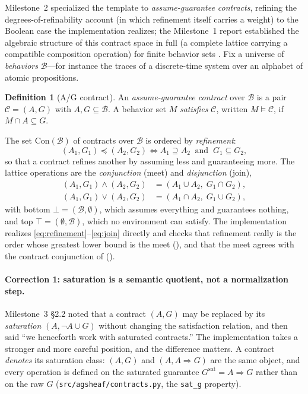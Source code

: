 \documentclass[11pt]{article}
\renewcommand{\preceq}{\preccurlyeq}
\newcommand{\contract}[1]{\mathrm{Con}(#1)}
\newcommand{\meet}{\wedge}
\newcommand{\join}{\vee}
\theoremstyle{definition}
\newtheorem{definition}{Definition}
\theoremstyle{remark}
\begin{document}
Milestone~2 specialized the template to \emph{assume-guarantee contracts}, refining the
degrees-of-refinability account (in which refinement itself carries a weight) to the Boolean
case the implementation realizes; the Milestone~1 report established the algebraic structure of
this contract space in full (a complete lattice carrying a compatible composition operation)
for finite behavior sets \citep{riessSEAMANMS1}.
Fix a universe of \emph{behaviors} $\mathcal{B}$---for instance the traces of a discrete-time
system over an alphabet of atomic propositions.

\begin{definition}[A/G contract]
An \emph{assume-guarantee contract} over $\mathcal{B}$ is a pair $\mathcal{C} = (A, G)$ with
$A, G \subseteq \mathcal{B}$.
A behavior set $M$ \emph{satisfies} $\mathcal{C}$, written $M \models \mathcal{C}$, if
$M \cap A \subseteq G$.
\end{definition}

The set $\contract{\mathcal{B}}$ of contracts over $\mathcal{B}$ is ordered by
\emph{refinement}:
\begin{equation}
\label{eq:refinement}
(A_1, G_1) \preceq (A_2, G_2) \iff A_1 \supseteq A_2 \ \text{ and } \ G_1 \subseteq G_2,
\end{equation}
so that a contract refines another by assuming less and guaranteeing more.
The lattice operations are the \emph{conjunction} (meet) and \emph{disjunction} (join),
\begin{align}
\label{eq:meet}
(A_1, G_1) \meet (A_2, G_2) &= (A_1 \cup A_2,\; G_1 \cap G_2), \\
\label{eq:join}
(A_1, G_1) \join (A_2, G_2) &= (A_1 \cap A_2,\; G_1 \cup G_2),
\end{align}
with bottom $\bot = (\mathcal{B}, \emptyset)$, which assumes everything and guarantees nothing,
and top $\top = (\emptyset, \mathcal{B})$, which no environment can satisfy.
The implementation realizes \eqref{eq:refinement}--\eqref{eq:join} directly and checks that
refinement really is the order whose greatest lower bound is the meet
(), and that the meet agrees with the contract
conjunction of \citet{naikContractEmbeddingsLayered2025}
().

\paragraph{Correction 1: saturation is a semantic quotient, not a normalization step.}
Milestone~3 \S2.2 noted that a contract $(A, G)$ may be replaced by its \emph{saturation}
$(A, \neg A \cup G)$ without changing the satisfaction relation, and then said ``we henceforth
work with saturated contracts.''
The implementation takes a stronger and more careful position, and the difference matters.
A contract \emph{denotes} its saturation class: $(A, G)$ and $(A, A \Rightarrow G)$ are the
same object, and every operation is defined on the saturated guarantee
$G^{\mathrm{sat}} = A \Rightarrow G$ rather than on the raw $G$
(\texttt{src/agsheaf/contracts.py}, the \texttt{sat\_g} property).
\end{document}
